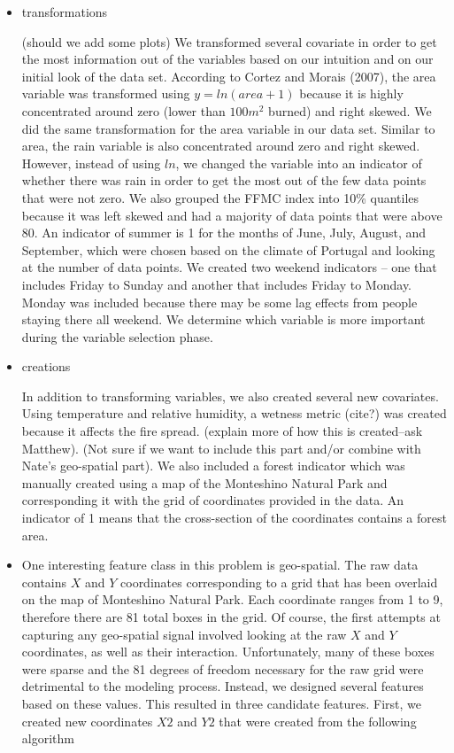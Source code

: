 \documentclass{article}
\begin{document}
\begin{itemize}

\item transformations
\par
(should we add some plots) We transformed several covariate in order to get the most information out of the variables based on our intuition and on our initial look of the data set. According to Cortez and Morais (2007), the area variable was transformed using $y = ln(area + 1)$ because it is highly concentrated around zero (lower than $100m^2$ burned) and right skewed. We did the same transformation for the area variable in our data set. Similar to area, the rain variable is also concentrated around zero and right skewed. However, instead of using $\textit{ln}$, we changed the variable into an indicator of whether there was rain in order to get the most out of the few data points that were not zero. We also grouped the FFMC index into 10\% quantiles because it was left skewed and had a majority of data points that were above 80. An indicator of summer is 1 for the months of June, July, August, and September, which were chosen based on the climate of Portugal and looking at the number of data points. We created two weekend indicators -- one that includes Friday to Sunday and another that includes Friday to Monday. Monday was included because there may be some lag effects from people staying there all weekend. We determine which variable is more important during the variable selection phase. 
\item creations
\par
In addition to transforming variables, we also created several new covariates. Using temperature and relative humidity, a wetness metric (cite?) was created because it affects the fire spread. (explain more of how this is created--ask Matthew). (Not sure if we want to include this part and/or combine with Nate's geo-spatial part). We also included a forest indicator which was manually created using a map of the Monteshino Natural Park and corresponding it with the grid of coordinates provided in the data. An indicator of 1 means that the cross-section of the coordinates contains a forest area. 
\item One interesting feature class in this problem is geo-spatial. The raw data contains $X$ and $Y$ coordinates corresponding to a grid that has been overlaid on the map of Monteshino Natural Park. Each coordinate ranges from 1 to 9, therefore there are 81 total boxes in the grid. Of course, the first attempts at capturing any geo-spatial signal involved looking at the raw $X$ and $Y$ coordinates, as well as their interaction. Unfortunately, many of these boxes were sparse and the 81 degrees of freedom necessary for the raw grid were detrimental to the modeling process. Instead, we designed several features based on these values. This resulted in three candidate features. First, we created new coordinates $X2$ and $Y2$ that were created from the following algorithm

\end{itemize}
\end{document}
